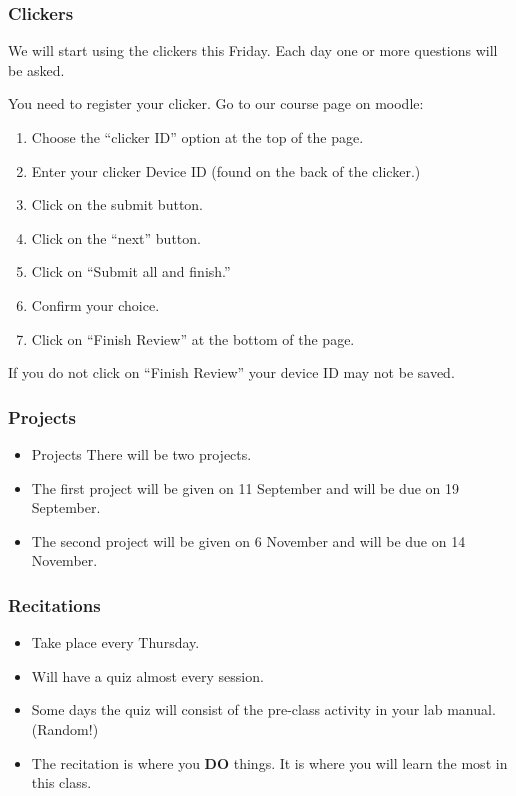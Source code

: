 \begin{frame}
  \frametitle{Clickers}

  We will start using the clickers this Friday. Each day one or more
  questions will be asked.

  You need to register your clicker. Go to our course page on moodle:
  \begin{enumerate}
  \item Choose the ``clicker ID'' option at the top of the page.
  \item Enter your clicker Device ID (found on the back of the
    clicker.)
  \item Click on the submit button.
  \item Click on the ``next'' button.
  \item Click on ``Submit all and finish.''
  \item Confirm your choice.
  \item Click on ``Finish Review'' at the bottom of the page.
  \end{enumerate}

  If you do not click on ``Finish Review'' your device ID may not be saved.
   
  
\end{frame}


\begin{frame}
  \frametitle{Projects}
\begin{itemize}
\item Projects There will be two projects. 
\item The first project will be given on 11 September and will be
due on 19 September. 
\item The second project will be given on 6 November and will be due on 14
November.
\end{itemize}
\end{frame}



\begin{frame}
  \frametitle{Recitations}

  \begin{itemize}
  \item Take place every Thursday.
  \item Will have a quiz almost every session.
  \item Some days the quiz will consist of the pre-class activity in
    your lab manual. (Random!)
  \item The recitation is where you \textbf{DO} things. It is where
    you will learn the most in this class.
  \end{itemize}
\end{frame}

